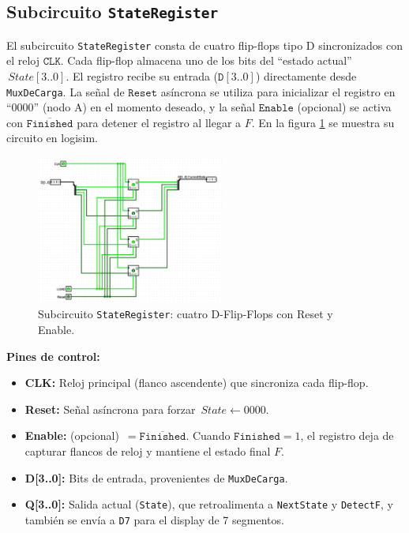 \documentclass[12pt]{article}
\begin{document}
\subsection{Subcircuito \texttt{StateRegister}}

El subcircuito \texttt{StateRegister} consta de cuatro flip-flops tipo D sincronizados con el
reloj \(\texttt{CLK}\). Cada flip-flop almacena uno de los bits del “estado actual” 
\(\,State[3..0]\). El registro recibe su entrada (\(\texttt{D}[3..0]\)) directamente desde 
\texttt{MuxDeCarga}. La señal de \(\texttt{Reset}\) asíncrona se utiliza para inicializar el registro en 
“0000” (nodo A) en el momento deseado, y la señal \(\texttt{Enable}\) (opcional) se activa con 
\(\overline{\texttt{Finished}}\) para detener el registro al llegar a \(F\). En la figura \ref{fig:stateregister} 
se muestra su circuito en logisim.

\begin{figure}[H]
  \centering
  \includegraphics[width=0.55\textwidth]{.github/stateregister.png}
  \caption{Subcircuito \texttt{StateRegister}: cuatro D-Flip-Flops con Reset y Enable.}
  \label{fig:stateregister}
\end{figure}

\noindent
\textbf{Pines de control:}
\begin{itemize}
  \item \textbf{CLK:} Reloj principal (flanco ascendente) que sincroniza cada flip-flop.  
  \item \textbf{Reset:} Señal asíncrona para forzar \(\,State \leftarrow 0000\).  
  \item \textbf{Enable:} (opcional) \(\,=\overline{\texttt{Finished}}\). Cuando \(\texttt{Finished}=1\), 
    el registro deja de capturar flancos de reloj y mantiene el estado final \(F\).  
  \item \textbf{D[3..0]:} Bits de entrada, provenientes de \texttt{MuxDeCarga}.  
  \item \textbf{Q[3..0]:} Salida actual (\texttt{State}), que retroalimenta a \texttt{NextState} y \texttt{DetectF}, 
    y también se envía a \texttt{D7} para el display de 7 segmentos.
\end{itemize}
\end{document}
